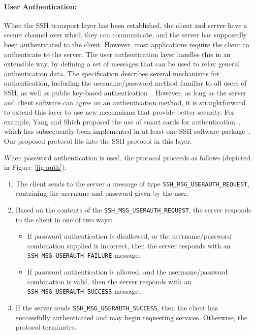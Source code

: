 \paragraph{User Authentication:}

When the SSH transport layer has been established, the client and
server have a secure channel over which they can communicate, and the
server has supposedly been authenticated to the client. However, most
applications require the client to authenticate to the server. The
user authentication layer handles this in an extensible way, by
defining a set of messages that can be used to relay general
authentication data. The specification describes several mechanisms
for authentication, including the username/password method familiar to
all users of SSH, as well as public key-based
authentication~\cite{rfc4252}. However, as long as the server and
client software can agree on an authentication method, it is
straightforward to extend this layer to use new mechanisms that
provide better security. For example, Yang and Shieh proposed the use
of smart cards for
authentication~\cite{DBLP:journals/compsec/YangS99}, which has
subsequently been implemented in at least one SSH software
package~\cite{opensc}. Our proposed protocol fits into the SSH
protocol in this layer.

When password authentication is used, the protocol proceeds as
follows (depicted in Figure~\ref{fig:auth}):
\begin{enumerate}
\item The client sends to the server a message of type
  \texttt{SSH\_MSG\_USERAUTH\_REQUEST}, containing the username and
  password given by the user.
\item Based on the contents of the
  \texttt{SSH\_MSG\_USERAUTH\_REQUEST}, the server responds to the
  client in one of two ways:
  \begin{itemize}
    \item If password authentication is disallowed, or
      the username/password combination supplied is incorrect, then
      the server responds with an \\ \texttt{SSH\_MSG\_USERAUTH\_FAILURE}
      message.
    \item If password authentication is allowed, and the
      username/pass\-word combination is valid, then the server responds
      with an \\ \texttt{SSH\_MSG\_USERAUTH\_SUCCESS} message.
  \end{itemize}
\item If the server sends \texttt{SSH\_MSG\_USERAUTH\_SUCCESS}, then
  the client has successfully authenticated and may begin requesting
  services. Otherwise, the protocol terminates.
\end{enumerate}

